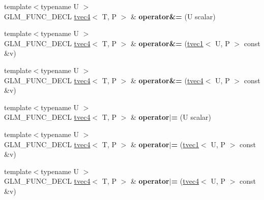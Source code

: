 \begin{DoxyCompactItemize}
\item 
\hypertarget{structglm_1_1tvec4_abc33b1e793f785556faaf26a7396fd7e}{{\footnotesize template$<$typename U $>$ }\\G\-L\-M\-\_\-\-F\-U\-N\-C\-\_\-\-D\-E\-C\-L \hyperlink{structglm_1_1tvec4}{tvec4}$<$ T, P $>$ \& {\bfseries operator\&=} (U scalar)}\label{structglm_1_1tvec4_abc33b1e793f785556faaf26a7396fd7e}

\item 
\hypertarget{structglm_1_1tvec4_a26423766721ad3b6e63c412c0464cb20}{{\footnotesize template$<$typename U $>$ }\\G\-L\-M\-\_\-\-F\-U\-N\-C\-\_\-\-D\-E\-C\-L \hyperlink{structglm_1_1tvec4}{tvec4}$<$ T, P $>$ \& {\bfseries operator\&=} (\hyperlink{structglm_1_1tvec1}{tvec1}$<$ U, P $>$ const \&v)}\label{structglm_1_1tvec4_a26423766721ad3b6e63c412c0464cb20}

\item 
\hypertarget{structglm_1_1tvec4_af779a1c66977b5d31c269e46c9f59723}{{\footnotesize template$<$typename U $>$ }\\G\-L\-M\-\_\-\-F\-U\-N\-C\-\_\-\-D\-E\-C\-L \hyperlink{structglm_1_1tvec4}{tvec4}$<$ T, P $>$ \& {\bfseries operator\&=} (\hyperlink{structglm_1_1tvec4}{tvec4}$<$ U, P $>$ const \&v)}\label{structglm_1_1tvec4_af779a1c66977b5d31c269e46c9f59723}

\item 
\hypertarget{structglm_1_1tvec4_ad25c16e99c736f476341ce104743ea33}{{\footnotesize template$<$typename U $>$ }\\G\-L\-M\-\_\-\-F\-U\-N\-C\-\_\-\-D\-E\-C\-L \hyperlink{structglm_1_1tvec4}{tvec4}$<$ T, P $>$ \& {\bfseries operator$\vert$=} (U scalar)}\label{structglm_1_1tvec4_ad25c16e99c736f476341ce104743ea33}

\item 
\hypertarget{structglm_1_1tvec4_a33c3ccecaa070fbab0ad4d3857ab084d}{{\footnotesize template$<$typename U $>$ }\\G\-L\-M\-\_\-\-F\-U\-N\-C\-\_\-\-D\-E\-C\-L \hyperlink{structglm_1_1tvec4}{tvec4}$<$ T, P $>$ \& {\bfseries operator$\vert$=} (\hyperlink{structglm_1_1tvec1}{tvec1}$<$ U, P $>$ const \&v)}\label{structglm_1_1tvec4_a33c3ccecaa070fbab0ad4d3857ab084d}

\item 
\hypertarget{structglm_1_1tvec4_acf72e48733651ac92f61ed70fe339a37}{{\footnotesize template$<$typename U $>$ }\\G\-L\-M\-\_\-\-F\-U\-N\-C\-\_\-\-D\-E\-C\-L \hyperlink{structglm_1_1tvec4}{tvec4}$<$ T, P $>$ \& {\bfseries operator$\vert$=} (\hyperlink{structglm_1_1tvec4}{tvec4}$<$ U, P $>$ const \&v)}\label{structglm_1_1tvec4_acf72e48733651ac92f61ed70fe339a37}


\end{DoxyCompactItemize}
